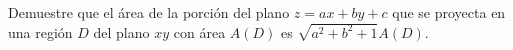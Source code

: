 \item Demuestre que el área de la porción del plano $z = ax + by + c$ que se proyecta en una región $D$ del plano $xy$ con área $A(D)$ es $\sqrt{a^2 + b^2 + 1} A(D)$.
